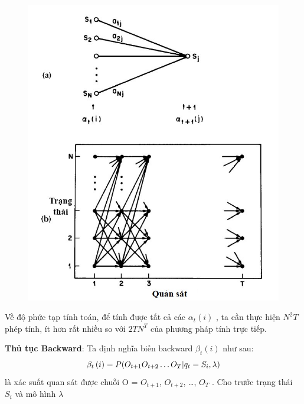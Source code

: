 \documentclass[13pt]{extreport}
\begin{document}
\begin{center}
\begin{figure}[H]
\begin{center}
\includegraphics[scale=0.6]{./uploads_new/Hidden_Markov_Model_1._Mo_hinh_Markov_Vi.docx_DIR/media/fig4.jpg}
\end{center}
\end{figure}
\end{center}

Về độ phức tạp tính toán, để tính được tất cả các  $  \alpha _{t} \left( i \right)  $
, ta cần thực hiện ${N^2}T$ phép tính, ít hơn rất nhiều so với $2TN^T$ của phương pháp tính trực tiếp. \par
\textbf{Thủ tục Backward}: Ta định nghĩa biến backward $  \beta _{t} \left( i \right)  $ như sau: $${\beta_t}\left( i \right) = P{\rm{(}}{O_{t + 1}}{O_{t + 2}} \ldots {O_T}{\rm{|}}{q_t} = {S_i}, \lambda ) $$
 là xác suất quan sát được chuỗi O =  $O_{t+1}$, $O_{t+2}$, …, $O_{T}$ . Cho trước trạng thái $S_i$ và mô hình $  \lambda  $
\end{document}
